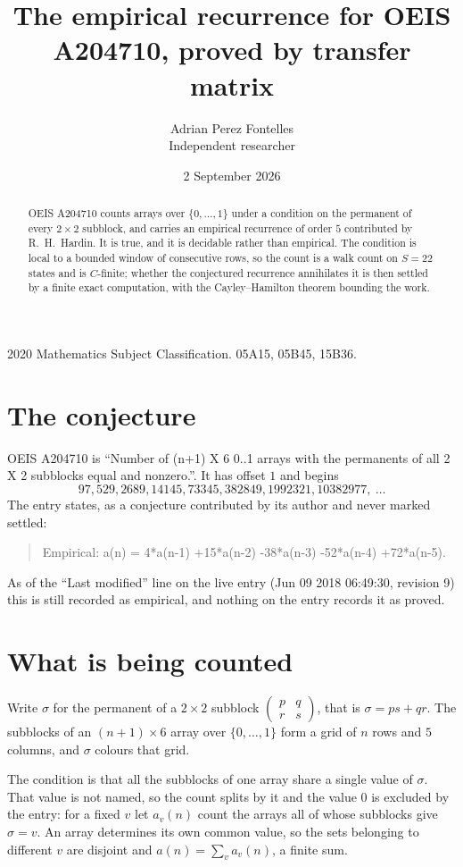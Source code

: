 \documentclass[11pt,a4paper]{article}
\title{The empirical recurrence for OEIS A204710, proved by transfer matrix}
\author{Adrian Perez Fontelles\\ \small Independent researcher}
\date{2 September 2026}
\theoremstyle{plain}
\theoremstyle{definition}
\begin{document}
\maketitle

\begin{abstract}
OEIS A204710 counts arrays over $\{0,\dots,1\}$ under a condition on the permanent of every
$2\times2$ subblock, and carries an empirical recurrence of order $5$ contributed by
R.~H.~Hardin. It is true, and it is decidable rather than empirical. The condition is local to
a bounded window of consecutive rows, so the count is a walk count on $S=22$ states and is
$C$-finite; whether the conjectured recurrence annihilates it is then settled by a finite exact
computation, with the Cayley--Hamilton theorem bounding the work.
\end{abstract}

\noindent\small 2020 Mathematics Subject Classification. 05A15, 05B45, 15B36.\normalsize

\section{The conjecture}

OEIS A204710 is ``Number of (n+1) X 6 0..1 arrays with the permanents of all 2 X 2 subblocks equal and nonzero.''. It has offset $1$ and begins
\[
97, 529, 2689, 14145, 73345, 382849, 1992321, 10382977,\ \dots
\]
The entry states, as a conjecture contributed by its author and never marked settled:
\begin{quote}
Empirical: a(n) = 4*a(n-1) +15*a(n-2) -38*a(n-3) -52*a(n-4) +72*a(n-5).
\end{quote}
As of the ``Last modified'' line on the live entry (Jun 09 2018 06:49:30, revision 9) this is still
recorded as empirical, and nothing on the entry records it as proved.

\section{What is being counted}

Write $\sigma$ for the permanent of a $2\times2$ subblock
$\begin{pmatrix}p&q\\r&s\end{pmatrix}$, that is $\sigma=ps+qr$. The subblocks of an
$(n+1)\times6$ array over $\{0,\dots,1\}$ form a grid of $n$ rows and $5$
columns, and $\sigma$ colours that grid.

The condition is that all the subblocks of one array share a single value of $\sigma$. That
value is not named, so the count splits by it and the value $0$ is excluded by the entry: for a fixed $v$ let $a_v(n)$ count the
arrays all of whose subblocks give $\sigma=v$. An array determines its own common value, so
the sets belonging to different $v$ are disjoint and $a(n)=\sum_v a_v(n)$, a finite sum.
\end{document}
